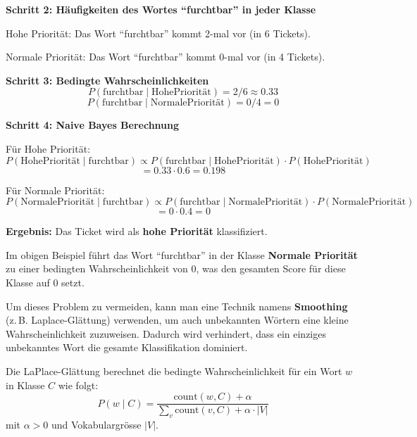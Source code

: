 \begin{myexercise}
\begin{myanswer}
        \textbf{Schritt 2: Häufigkeiten des Wortes \enquote{furchtbar} in jeder Klasse}

        Hohe Priorität: Das Wort \enquote{furchtbar} kommt 2-mal vor (in 6 Tickets).

        Normale Priorität: Das Wort \enquote{furchtbar} kommt 0-mal vor (in 4 Tickets).

        \textbf{Schritt 3: Bedingte Wahrscheinlichkeiten}
        \[
            P(\text{furchtbar}\mid\text{HohePriorität}) = 2/6 \approx 0.33
        \]
        \[
            P(\text{furchtbar}\mid\text{NormalePriorität}) = 0/4 = 0
        \]

        \textbf{Schritt 4: Naive Bayes Berechnung}

        Für Hohe Priorität:
        \[
            P(\text{HohePriorität}\mid\text{furchtbar})  \propto P(\text{furchtbar}\mid\text{HohePriorität}) \cdot P(\text{HohePriorität})
        \]
        \[
            = 0.33 \cdot 0.6 = 0.198
        \]

        Für Normale Priorität:
        \[
            P(\text{NormalePriorität}\mid\text{furchtbar}) \propto P(\text{furchtbar}\mid\text{NormalePriorität}) \cdot P(\text{NormalePriorität})
        \]
        \[
            = 0 \cdot 0.4 = 0
        \]

        \textbf{Ergebnis:} Das Ticket wird als \textbf{hohe Priorität} klassifiziert.
    \end{myanswer}
\end{myexercise}
\begin{mydefinition}[Smoothing]
    Im obigen Beispiel führt das Wort \enquote{furchtbar} in der Klasse \textbf{Normale Priorität} zu einer bedingten Wahrscheinlichkeit von 0, was den gesamten Score für diese Klasse auf 0 setzt.

    Um dieses Problem zu vermeiden, kann man eine Technik namens \textbf{Smoothing} (z.\,B. Laplace-Glättung) verwenden, um auch unbekannten Wörtern eine kleine Wahrscheinlichkeit zuzuweisen. Dadurch wird verhindert, dass ein einziges unbekanntes Wort die gesamte Klassifikation dominiert.

    Die LaPlace-Glättung berechnet die bedingte Wahrscheinlichkeit für ein Wort $w$ in Klasse $C$ wie folgt:
    \[
        P(w\mid C)=\frac{\text{count}(w,C)+\alpha}{\sum_v \text{count}(v,C)+\alpha\cdot |V|}
    \]
    mit $\alpha>0$ und Vokabulargrösse $|V|$.
\end{mydefinition}

